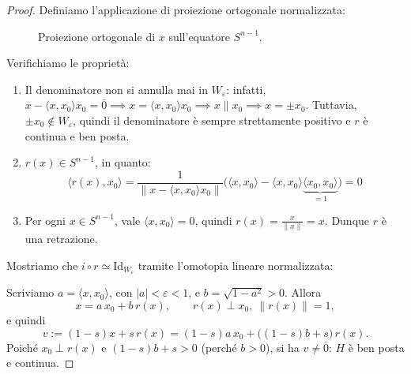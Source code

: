 \begin{proof}
Definiamo l'applicazione di proiezione ortogonale normalizzata:

\begin{figure}[H]
    \centering
    \caption{Proiezione ortogonale di $x$ sull'equatore $S^{n-1}$.}
\end{figure}

Verifichiamo le proprietà:
\begin{enumerate}[label=\roman*)]
    \item Il denominatore non si annulla mai in $W_\varepsilon$: infatti, $x - \langle x, x_0 \rangle x_0 = \bar{0} \implies x = \langle x, x_0 \rangle x_0 \implies x \mathbin{\|} x_0 \implies x = \pm x_0$. Tuttavia, $\pm x_0 \notin W_\varepsilon$, quindi il denominatore è sempre strettamente positivo e $r$ è continua e ben posta.
    \item $r(x) \in S^{n-1}$, in quanto:
    \[
    \langle r(x), x_0 \rangle = \frac{1}{\|x - \langle x, x_0 \rangle x_0\|} \Big( \langle x, x_0 \rangle - \langle x, x_0 \rangle \underbrace{\langle x_0, x_0 \rangle}_{=1} \Big) = 0
    \]
    \item Per ogni $x \in S^{n-1}$, vale $\langle x, x_0 \rangle = 0$, quindi $r(x) = \frac{x}{\|x\|} = x$. Dunque $r$ è una retrazione.
\end{enumerate}

Mostriamo che $i \circ r \simeq \mathrm{Id}_{W_\varepsilon}$ tramite l'omotopia lineare normalizzata:

Scriviamo $a = \langle x, x_0 \rangle$, con $|a| < \varepsilon < 1$, e $b = \sqrt{1-a^2} > 0$. Allora
\[
x = a\,x_0 + b\,r(x), \qquad r(x) \perp x_0, \ \|r(x)\| = 1 ,
\]
e quindi
\[
v := (1-s)x + s\,r(x) = (1-s)a\,x_0 + \big( (1-s)b + s \big)\, r(x).
\]
Poich\'e $x_0 \perp r(x)$ e $(1-s)b + s > 0$ (perch\'e $b>0$), si ha $v \neq \bar{0}$: $H$ \`e ben posta e continua.


\end{proof}
